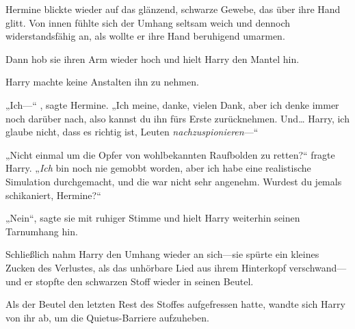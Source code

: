 Hermine blickte wieder auf das glänzend, schwarze Gewebe, das über ihre Hand glitt. Von innen fühlte sich der Umhang seltsam weich und dennoch widerstandsfähig an, als wollte er ihre Hand beruhigend umarmen.

Dann hob sie ihren Arm wieder hoch und hielt Harry den Mantel hin.

Harry machte keine Anstalten ihn zu nehmen.

„Ich—“ , sagte Hermine. „Ich meine, danke, vielen Dank, aber ich denke immer noch darüber nach, also kannst du ihn fürs Erste zurücknehmen. Und… Harry, ich glaube nicht, dass es richtig ist, Leuten \emph{nachzuspionieren}—“

„Nicht einmal um die Opfer von wohlbekannten Raufbolden zu retten?“ fragte Harry. „\emph{Ich} bin noch nie gemobbt worden, aber ich habe eine realistische Simulation durchgemacht, und die war nicht sehr angenehm. Wurdest du jemals schikaniert, Hermine?“

„Nein“, sagte sie mit ruhiger Stimme und hielt Harry weiterhin seinen Tarnumhang hin.

Schließlich nahm Harry den Umhang wieder an sich—sie spürte ein kleines Zucken des Verlustes, als das unhörbare Lied aus ihrem Hinterkopf verschwand—und er stopfte den schwarzen Stoff wieder in seinen Beutel.

Als der Beutel den letzten Rest des Stoffes aufgefressen hatte, wandte sich Harry von ihr ab, um die Quietus-Barriere aufzuheben.

